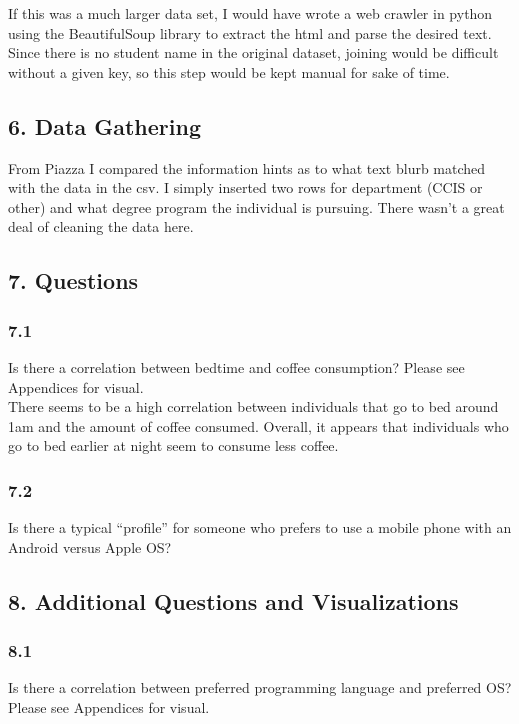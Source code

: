 \documentclass{neu_handout}
\begin{document}
If this was a much larger data set, I would have wrote a web crawler in python using the BeautifulSoup library to extract the html and parse the desired text. Since there is no student name in the original dataset, joining would be difficult without a given key, so this step would be kept manual for sake of time.

\subsection*{6. Data Gathering}
From Piazza I compared the information hints as to what text blurb matched with the data in the csv. I simply inserted two rows for department (CCIS or other) and what degree program the individual is pursuing. There wasn't a great deal of cleaning the data here.

\subsection*{7. Questions}

\subsubsection*{7.1}
Is there a correlation between bedtime and coffee consumption? Please see Appendices for visual.\\

There seems to be a high correlation between individuals that go to bed around 1am and the amount of coffee consumed. Overall, it appears that individuals who go to bed earlier at night seem to consume less coffee.

\subsubsection*{7.2}
Is there a typical “profile” for someone who prefers to use a mobile phone with an
Android versus Apple OS?

\subsection*{8. Additional Questions and Visualizations}


\subsubsection*{8.1}
Is there a correlation between preferred programming language and preferred OS? Please see Appendices for visual.\\
\end{document}
